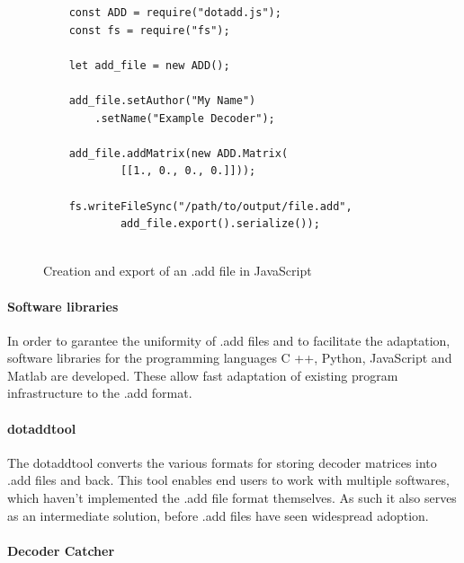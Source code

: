 \documentclass[a4paper, 10pt, twocolumn]{article}
\begin{document}
\vspace{3mm}
\begin{figure}[htb]
\begin{lstlisting}
    const ADD = require("dotadd.js");
    const fs = require("fs");
    
    let add_file = new ADD();
    
    add_file.setAuthor("My Name")
        .setName("Example Decoder");
    
    add_file.addMatrix(new ADD.Matrix(
            [[1., 0., 0., 0.]]));
    
    fs.writeFileSync("/path/to/output/file.add", 
            add_file.export().serialize());
    
    \end{lstlisting}
\caption{Creation and export of an .add file in JavaScript}\label{fig:dotadd}
\end{figure}
\vspace{2mm}


\paragraph{Software libraries}

In order to garantee the uniformity of .add files and to facilitate the adaptation, software libraries for the programming languages C ++, Python, JavaScript and Matlab are developed. These allow fast adaptation of existing program infrastructure to the .add format.


\paragraph{dotaddtool} 
The dotaddtool converts the various formats for storing decoder matrices into .add files and back. This tool enables end users to work with multiple softwares, which haven't implemented the .add file format themselves. As such it also serves as an intermediate solution, before .add files have seen widespread adoption.


\paragraph{Decoder Catcher}
\end{document}
